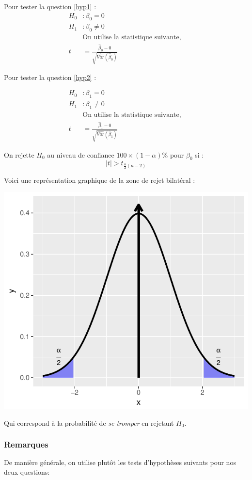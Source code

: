 \documentclass[11pt,french]{report}
\begin{document}
Pour tester la question \ref{hyp1} :
\begin{align*}
H_0 &: \beta_0 = 0 \\
H_1 &: \beta_0 \neq 0 \\
&\text{On utilise la statistique suivante, } \\
t &= \frac{\hat{\beta}_0 - 0 }{\sqrt{\widehat{Var}(\hat{\beta}_0)}}
\end{align*}

Pour tester la question  \ref{hyp2} :

\begin{align*}
H_0 &: \beta_1 = 0 \\
H_1 &: \beta_1 \neq 0 \\
&\text{On utilise la statistique suivante, } \\
t &= \frac{\hat{\beta}_1 - 0 }{\sqrt{\widehat{Var}(\hat{\beta}_1)}}
\end{align*}

On rejette $H_0$ au niveau de confiance $100 \times (1 - \alpha)\%$ pour $\beta_0$ si :
$$
|t| > t_{\frac{\alpha}{2}(n-2)}
$$

Voici une représentation graphique de la zone de rejet bilatéral :

\includegraphics{notes_de_cours-016}

Qui correspond à la probabilité de \emph{se tromper} en rejetant $H_0$.

\subsubsection*{Remarques}
De manière générale, on utilise plutôt les tests d'hypothèses suivants pour nos deux questions:
\end{document}
